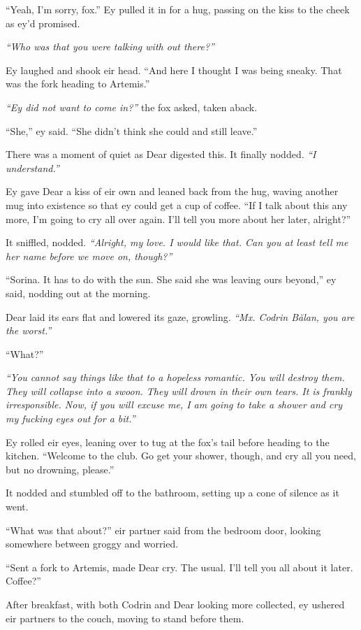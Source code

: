 ``Yeah, I'm sorry, fox.'' Ey pulled it in for a hug, passing on the kiss to the cheek as ey'd promised.

\emph{``Who was that you were talking with out there?''}

Ey laughed and shook eir head. ``And here I thought I was being sneaky. That was the fork heading to Artemis.''

\emph{``Ey did not want to come in?''} the fox asked, taken aback.

``She,'' ey said. ``She didn't think she could and still leave.''

There was a moment of quiet as Dear digested this. It finally nodded. \emph{``I understand.''}

Ey gave Dear a kiss of eir own and leaned back from the hug, waving another mug into existence so that ey could get a cup of coffee. ``If I talk about this any more, I'm going to cry all over again. I'll tell you more about her later, alright?''

It sniffled, nodded. \emph{``Alright, my love. I would like that. Can you at least tell me her name before we move on, though?''}

``Sorina. It has to do with the sun. She said she was leaving ours beyond,'' ey said, nodding out at the morning.

Dear laid its ears flat and lowered its gaze, growling. \emph{``Mx. Codrin Bălan, you are the worst.''}

``What?''

\emph{``You cannot say things like that to a hopeless romantic. You will destroy them. They will collapse into a swoon. They will drown in their own tears. It is frankly irresponsible. Now, if you will excuse me, I am going to take a shower and cry my fucking eyes out for a bit.''}

Ey rolled eir eyes, leaning over to tug at the fox's tail before heading to the kitchen. ``Welcome to the club. Go get your shower, though, and cry all you need, but no drowning, please.''

It nodded and stumbled off to the bathroom, setting up a cone of silence as it went.

``What was that about?'' eir partner said from the bedroom door, looking somewhere between groggy and worried.

``Sent a fork to Artemis, made Dear cry. The usual. I'll tell you all about it later. Coffee?''

After breakfast, with both Codrin and Dear looking more collected, ey ushered eir partners to the couch, moving to stand before them.

